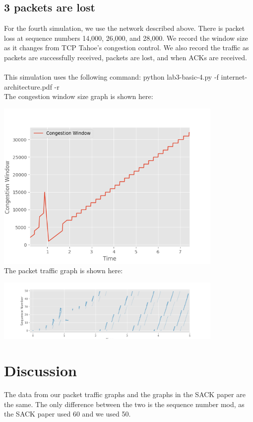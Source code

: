 \documentclass[fleqn,11pt]{article}
\begin{document}
\subsection{3 packets are lost}
For the fourth simulation, we use the network described above. There is packet loss at sequence numbers 14,000, 26,000, and 28,000. We record the window size as it changes from TCP Tahoe's congestion control. We also record the traffic as packets are successfully received, packets are lost, and when ACKs are received.\\\\
This simulation uses the following command: python lab3-basic-4.py -f internet-architecture.pdf -r\\

The congestion window size graph is shown here:

\includegraphics[width=11cm]{cwnd4}\\

The packet traffic graph is shown here:

\includegraphics[width=11cm]{sequence4}\\

\section{Discussion}
The data from our packet traffic graphs and the graphs in the SACK paper are the same. The only difference between the two is the sequence number mod, as the SACK paper used 60 and we used 50.
\end{document}
